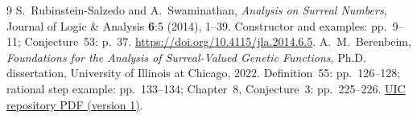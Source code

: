 \documentclass[11pt,letterpaper]{article}
\begin{document}
\begin{thebibliography}{9}
 S.~Rubinstein-Salzedo and A.~Swaminathan,
\emph{Analysis on Surreal Numbers}, Journal of Logic \& Analysis
\textbf{6}:5 (2014), 1--39. Constructor and examples: pp.~9--11;
Conjecture~53: p.~37.
\url{https://doi.org/10.4115/jla.2014.6.5}.
 A.~M.~Berenbeim,
\emph{Foundations for the Analysis of Surreal-Valued Genetic Functions},
Ph.D. dissertation, University of Illinois at Chicago, 2022.
Definition~55: pp.~126--128; rational step example: pp.~133--134;
Chapter~8, Conjecture~3: pp.~225--226.
\href{https://indigo.uic.edu/articles/thesis/Foundations_for_the_Analysis_of_Surreal-Valued_Genetic_Functions/20253705/1/files/36188862.pdf}{UIC repository PDF (version 1)}.
\end{thebibliography}
\end{document}
